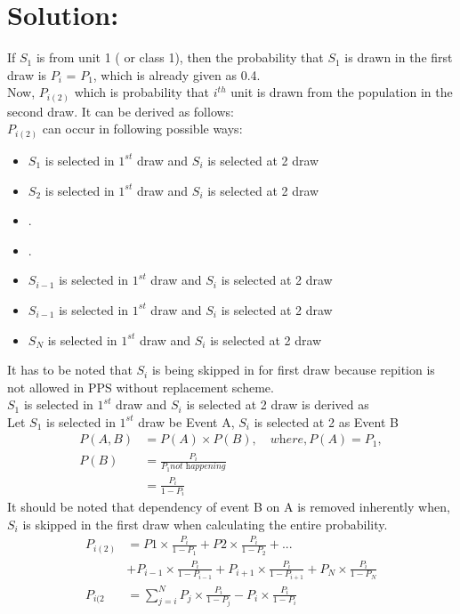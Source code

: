 \documentclass{article}
\begin{document}
\section{Solution:}
If $S_1$ is from unit 1 ( or class 1), then the probability that $S_1$ is drawn in the first draw is $P_i$ = $P_1$, which is already given as 0.4.\\
Now, $P_{i(2)}$ which is probability that $i^{th}$ unit is drawn from the population in the second draw. It can be derived as follows:\\
$P_{i(2)}$ can occur in following possible ways:\\
\begin{itemize}
    \item $S_1$ is selected in $1^{st}$ draw and $S_i$ is selected at 2 draw
    \item $S_2$ is selected in $1^{st}$ draw and $S_i$ is selected at 2 draw
    \item .
    \item .
    \item $S_{i-1}$ is selected in $1^{st}$ draw and $S_i$ is selected at 2 draw
    \item $S_{i-1}$ is selected in $1^{st}$ draw and $S_i$ is selected at 2 draw
    \item $S_{N}$ is selected in $1^{st}$ draw and $S_i$ is selected at 2 draw
\end{itemize}
It has to be noted that $S_i$ is being skipped in for first draw because repition is not allowed in PPS without replacement scheme.\\
$S_1$ is selected in $1^{st}$ draw and $S_i$ is selected at 2 draw is derived as\\
Let $S_1$ is selected in $1^{st}$ draw be Event A, $S_i$ is selected at 2 as Event B
\begin{align*}
P (A,B) &= P(A) \times P(B), 
\quad \textit{where}, P(A) = P_1, \\
P(B) &=\frac{P_i}{P_1 \textit{not happening}}\\
     &= \frac{P_i}{1-P_i}
\end{align*}
It should be noted that dependency of event B on A is removed inherently when, $S_i$ is skipped in the first draw when calculating the entire probability.
\begin{align*}
P_{i(2)} &= P1 \times \frac{P_i}{1-P_1} + P2 \times \frac{P_i}{1-P_2} + ... \\ &+ P_{i-1} \times \frac{P_{i}}{1-P_{i-1}} + P_{i+1} \times \frac{P_{i}}{1-P_{i+1}} + P_{N} \times \frac{P_{i}}{1-P_{N}}\\
P_{i(2} &= \sum_{j=i}^N P_j \times \frac{P_i}{1-P_j} - P_i \times \frac{P_i}{1-P_i}
\end{align*}
\end{document}
